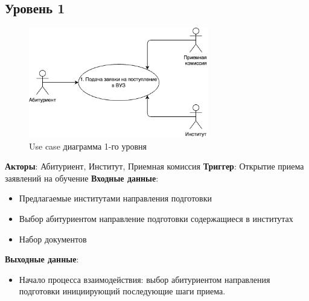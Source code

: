 \documentclass[areasetadvanced]{scrartcl}
\begin{document}
\subsection{Уровень 1}
\begin{figure}[H]
    \centering
    \includegraphics[width=0.7\textwidth]{images/UseCase_1.drawio.png}
    \caption{Use case диаграмма 1-го уровня}
    \label{fig:syntdiag}
\end{figure}
\textbf{Акторы}: Абитуриент, Институт, Приемная комиссия
\textbf{Триггер}: Открытие приема заявлений на обучение
\textbf{Входные данные}:
\begin{itemize}
    \item Предлагаемые институтами направления подготовки
    \item Выбор абитуриентом направление подготовки содержащиеся в институтах
    \item Набор документов
\end{itemize}
\textbf{Выходные данные}:
\begin{itemize}
    \item Начало процесса взаимодействия: выбор абитуриентом направления подготовки инициирующий последующие шаги приема.
\end{itemize}
\end{document}
